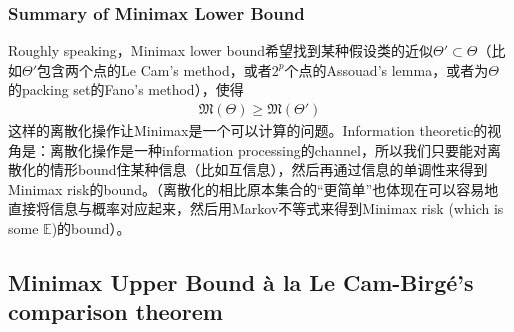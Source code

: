 \documentclass[11pt,a4paper]{ctexart}
\numberwithin{equation}{section}%
\begin{document}
\begin{enumerate}[topsep=2pt,itemsep=0pt]
\end{enumerate}

    
\subsubsection{Summary of Minimax Lower Bound}
Roughly speaking，Minimax lower bound希望找到某种假设类的近似$ \Theta'\subset \Theta  $（比如$ \Theta' $包含两个点的Le Cam's method，或者$ 2^p $个点的Assouad's lemma，或者为$ \Theta $的packing set的Fano's method），使得
\begin{align*}
    \mathfrak{M}(\Theta)\geq \mathfrak{M}(\Theta')
\end{align*}
这样的离散化操作让Minimax是一个可以计算的问题。Information theoretic的视角是：离散化操作是一种information processing的channel，所以我们只要能对离散化的情形bound住某种信息（比如互信息），然后再通过信息的单调性来得到Minimax risk的bound。（离散化的相比原本集合的“更简单”也体现在可以容易地直接将信息与概率对应起来，然后用Markov不等式来得到Minimax risk (which is some $ \mathbb{E} $)的bound）。





\subsection{Minimax Upper Bound \`a la Le Cam-Birg\'e's comparison theorem}
\end{document}
